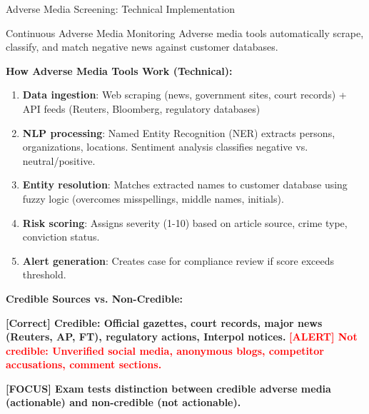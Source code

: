 \documentclass[11pt,a4paper]{beamer}
\newcommand{\redflag}[1]{\textcolor{red}{\textbf{[ALERT] #1}}}
\newcommand{\greennote}[1]{\textcolor{green!50!black}{\textbf{[Correct] #1}}}
\newcommand{\examfocus}[1]{\textcolor{orange!80!black}{\textbf{[FOCUS] #1}}}
\begin{document}
\begin{frame}{Adverse Media Screening: Technical Implementation}
	\begin{block}{Continuous Adverse Media Monitoring}
		Adverse media tools automatically scrape, classify, and match negative news against customer databases.
	\end{block}
	\textbf{How Adverse Media Tools Work (Technical):}
	\begin{enumerate}
		\item \textbf{Data ingestion}: Web scraping (news, government sites, court records) + API feeds (Reuters, Bloomberg, regulatory databases)
		\item \textbf{NLP processing}: Named Entity Recognition (NER) extracts persons, organizations, locations. Sentiment analysis classifies negative vs. neutral/positive.
		\item \textbf{Entity resolution}: Matches extracted names to customer database using fuzzy logic (overcomes misspellings, middle names, initials).
		\item \textbf{Risk scoring}: Assigns severity (1-10) based on article source, crime type, conviction status.
		\item \textbf{Alert generation}: Creates case for compliance review if score exceeds threshold.
	\end{enumerate}
	\textbf{Credible Sources vs. Non-Credible:}
	\begin{itemize}
		\greennote{Credible: Official gazettes, court records, major news (Reuters, AP, FT), regulatory actions, Interpol notices.}
		\redflag{Not credible: Unverified social media, anonymous blogs, competitor accusations, comment sections.}
	\end{itemize}
	\examfocus{Exam tests distinction between credible adverse media (actionable) and non-credible (not actionable).}
\end{frame}
\end{document}
